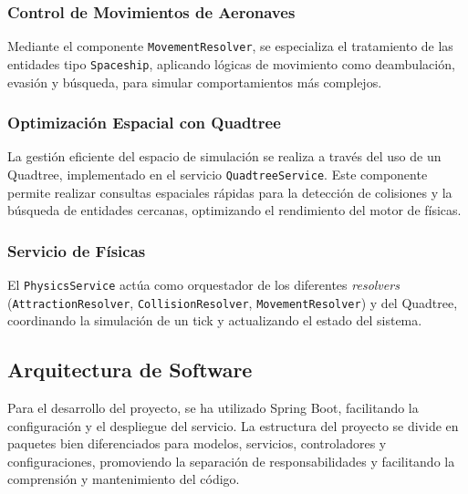 \subsubsection{Control de Movimientos de Aeronaves}
Mediante el componente \texttt{MovementResolver}, se especializa el tratamiento de las entidades tipo \texttt{Spaceship}, aplicando lógicas de movimiento como deambulación, evasión y búsqueda, para simular comportamientos más complejos.

\subsubsection{Optimización Espacial con Quadtree}
La gestión eficiente del espacio de simulación se realiza a través del uso de un Quadtree, implementado en el servicio \texttt{QuadtreeService}. Este componente permite realizar consultas espaciales rápidas para la detección de colisiones y la búsqueda de entidades cercanas, optimizando el rendimiento del motor de físicas.

\subsubsection{Servicio de Físicas}
El \texttt{PhysicsService} actúa como orquestador de los diferentes \textit{resolvers} (\texttt{AttractionResolver}, \texttt{CollisionResolver}, \texttt{MovementResolver}) y del Quadtree, coordinando la simulación de un tick y actualizando el estado del sistema.

\subsection{Arquitectura de Software}
Para el desarrollo del proyecto, se ha utilizado Spring Boot, facilitando la configuración y el despliegue del servicio. La estructura del proyecto se divide en paquetes bien diferenciados para modelos, servicios, controladores y configuraciones, promoviendo la separación de responsabilidades y facilitando la comprensión y mantenimiento del código.
